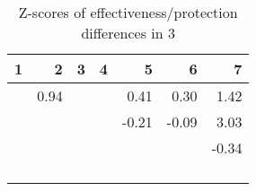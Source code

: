 \begin{table}[ht]
\centering
\begin{tabular}{rrrrrrr}
  \hline
1 & 2 & 3 & 4 & 5 & 6 & 7 \\ 
  \hline
 & 0.94 &  &  & 0.41 & 0.30 & 1.42 \\ 
   &  &  &  & -0.21 & -0.09 & 3.03 \\ 
   &  &  &  &  &  & -0.34 \\ 
   &  &  &  &  &  &  \\ 
   &  &  &  &  &  &  \\ 
   &  &  &  &  &  &  \\ 
   &  &  &  &  &  &  \\ 
   \hline
\end{tabular}
\caption{Z-scores of effectiveness/protection differences in  3} 
\end{table}
